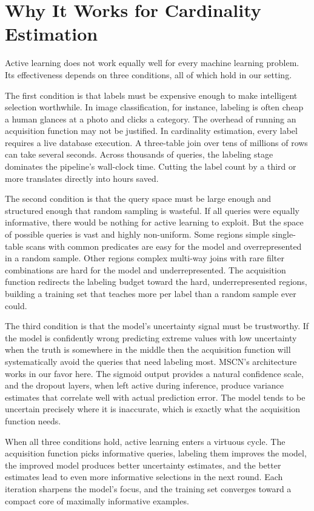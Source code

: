 \section{Why It Works for Cardinality Estimation}

Active learning does not work equally well for every machine learning problem. Its effectiveness depends on three conditions, all of which hold in our setting.

The first condition is that labels must be expensive enough to make intelligent selection worthwhile. In image classification, for instance, labeling is often cheap a human glances at a photo and clicks a category. The overhead of running an acquisition function may not be justified. In cardinality estimation, every label requires a live database execution. A three-table join over tens of millions of rows can take several seconds. Across thousands of queries, the labeling stage dominates the pipeline's wall-clock time. Cutting the label count by a third or more translates directly into hours saved.

The second condition is that the query space must be large enough and structured enough that random sampling is wasteful. If all queries were equally informative, there would be nothing for active learning to exploit. But the space of possible queries is vast and highly non-uniform. Some regions simple single-table scans with common predicates are easy for the model and overrepresented in a random sample. Other regions complex multi-way joins with rare filter combinations are hard for the model and underrepresented. The acquisition function redirects the labeling budget toward the hard, underrepresented regions, building a training set that teaches more per label than a random sample ever could.

The third condition is that the model's uncertainty signal must be trustworthy. If the model is confidently wrong predicting extreme values with low uncertainty when the truth is somewhere in the middle then the acquisition function will systematically avoid the queries that need labeling most. MSCN's architecture works in our favor here. The sigmoid output provides a natural confidence scale, and the dropout layers, when left active during inference, produce variance estimates that correlate well with actual prediction error. The model tends to be uncertain precisely where it is inaccurate, which is exactly what the acquisition function needs.

When all three conditions hold, active learning enters a virtuous cycle. The acquisition function picks informative queries, labeling them improves the model, the improved model produces better uncertainty estimates, and the better estimates lead to even more informative selections in the next round. Each iteration sharpens the model's focus, and the training set converges toward a compact core of maximally informative examples.
